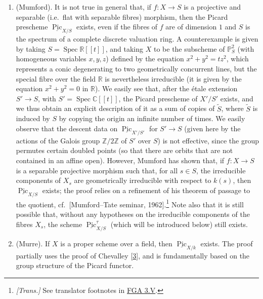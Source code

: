\documentclass{article}
\newcommand{\oldpage}[1]{\marginpar{\footnotesize$\Big\vert$ \textit{p.~#1}}}
\theoremstyle{definition}
\theoremstyle{definition}
\theoremstyle{definition}
\theoremstyle{definition}
\theoremstyle{remark}
\begin{document}
\begin{enumerate}
\def\labelenumi{\alph{enumi}.}
\item
  (Mumford).
  It is not true in general that, if \(f\colon X\to S\) is a projective and separable (i.e.~flat with separable fibres) morphism, then the Picard prescheme \(\underline{\operatorname{Pic}}_{X/S}\) exists, even if the fibres of \(f\) are of dimension \(1\) and \(S\) is the spectrum of a complete discrete valuation ring.
  A counterexample is given by taking \(S=\operatorname{Spec}\mathbb{R}[[t]]\), and taking \(X\) to be the subscheme of \(\mathbb{P}_S^2\) (with homogeneous variables \(x,y,z\)) defined by the equation \(x^2+y^2=tz^2\), which represents a conic degenerating to two geometrically concurrent lines, but the special fibre over the field \(\mathbb{R}\) is nevertheless irreducible (it is given by the equation \(x^2+y^2=0\) in \(\mathbb{R}\)).
  We easily see that, after the étale extension \(S'\to S\), with \(S'=\operatorname{Spec}\mathbb{C}[[t]]\), the Picard prescheme of \(X'/S'\) exists, and we thus obtain an explicit description of it as a sum of copies of \(\widetilde{S}\), where \(\widetilde{S}\) is induced by \(S\) by copying the origin an infinite number of times.
  We easily observe that the descent data on \(\underline{\operatorname{Pic}}_{X'/S'}\) for \(S'\to S\) (given here by the actions of the Galois group \(\mathbb{Z}/2\mathbb{Z}\) of \(S'\) over \(S\)) is not effective, since the group permutes certain doubled points (so that there are orbits that are not contained in an affine open).
  However, Mumford has shown that, if \(f\colon X\to S\) is a separable projective morphism such that, for all \(s\in S\), the irreducible components of \(X_s\) are geometrically irreducible with respect to \(k(s)\), then \(\underline{\operatorname{Pic}}_{X/S}\) exists;
  the proof relies on a refinement of his theorem of passage to the quotient, cf.~{[}Mumford--Tate seminar, 1962{]}.\footnote{\emph{{[}Trans.{]}} See translator footnotes in \protect\hyperlink{FGA-3-V.html}{FGA 3.V}.}
  Note also that it is still possible that, without any hypotheses on the irreducible components of the fibres \(X_s\), the scheme \(\underline{\operatorname{Pic}}_{X/S}^\tau\) (which will be introduced below) still exists.
\item
  (Murre).\oldpage{236-02}
  If \(X\) is a proper scheme over a field, then \(\underline{\operatorname{Pic}}_{X/k}\) exists.
  The proof partially uses the proof of Chevalley {[}\protect\hyperlink{ref-Che1960}{3}{]}, and is fundamentally based on the group structure of the Picard functor.
\end{enumerate}
\end{document}
